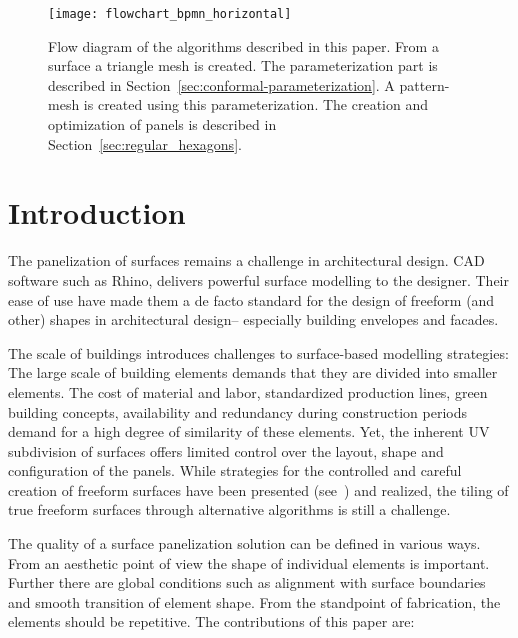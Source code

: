 \documentclass[article.tex]{subfiles}
\begin{document}
\begin{figure}[tb]
\centering
\texttt{[image: flowchart\_bpmn\_horizontal]}
\caption{Flow diagram of the algorithms described in this paper. From
  a \nurbs surface a triangle mesh is created. The parameterization
  part is described in Section~\ref{sec:conformal-parameterization}. A
  pattern-mesh is created using this parameterization. The creation
  and optimization of panels is described in
  Section~\ref{sec:regular_hexagons}.}
\label{fig:algorithm_diagram}
\end{figure}

\section{Introduction}
\label{sec:introduction}

The panelization of surfaces remains a challenge in architectural
design. CAD software such as Rhino, delivers powerful \nurbs surface
modelling to the designer. Their ease of use have made them a de facto
standard for the design of freeform (and other) shapes in
architectural design– especially building envelopes and facades.  

The scale of buildings introduces challenges to surface-based
modelling strategies: The large scale of building elements demands
that they are divided into smaller elements. The cost of material and
labor, standardized production lines, green building concepts,
availability and redundancy during construction periods demand for a
high degree of similarity of these elements. Yet, the inherent
UV subdivision of \nurbs surfaces offers limited control over the
layout, shape and configuration of the panels. While strategies for
the controlled and careful creation of freeform surfaces have been
presented (see~\cite{Ceccato}) and realized, the tiling of true
freeform surfaces through alternative algorithms is still a challenge.

The quality of a surface panelization solution can be defined in
various ways. From an aesthetic point of view the shape of individual
elements is important. Further there are global conditions such as
alignment with surface boundaries and smooth transition of element
shape. From the standpoint of fabrication, the elements should be
repetitive. The contributions of this paper are:
\end{document}
